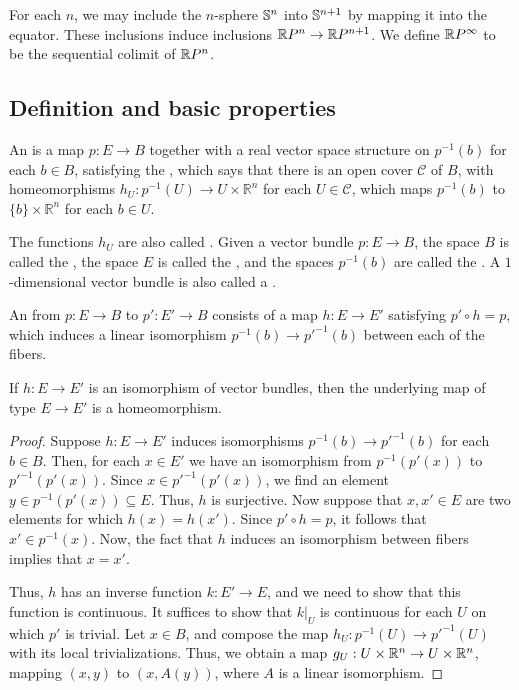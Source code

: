 \documentclass{article}
\begin{document}
\begin{defn}
For each $n$, we may include the $n$-sphere $\mathbb{S}^n$ into $\mathbb{S}^{n+1}$ by mapping
it into the equator. These inclusions induce inclusions $\mathbb{R} P^n\to \mathbb{R} P^{n+1}$.
We define $\mathbb{R} P^\infty$ to be the sequential colimit of $\mathbb{R} P^n$. 
\end{defn}

\subsection{Definition and basic properties}
\begin{defn}
An  is a map $p:E\to B$ together with a
real vector space structure on $p^{-1}(b)$ for each $b\in B$, satisfying the
, which says that there is an open cover 
$\mathcal{C}$ of $B$, with homeomorphisms $h_U:p^{-1}(U)\to U\times\mathbb{R}^n$
for each $U\in\mathcal{C}$, which maps $p^{-1}(b)$ to $\{b\}\times\mathbb{R}^n$
for each $b\in U$. 

The functions $h_U$ are also called . Given a
vector bundle $p:E\to B$, the space $B$ is called the , the
space $E$ is called the , and the spaces $p^{-1}(b)$ are
called the . A $1$-dimensional
vector bundle is also called a .
\end{defn}

\begin{defn}
An  from $p:E\to B$ to $p':E'\to B$
consists of a map $h:E\to E'$ satisfying $p'\circ h=p$, 
which induces a linear isomorphism
$p^{-1}(b)\to p'^{-1}(b)$ between each of the fibers.
\end{defn}

\begin{lem}
If $h:E\to E'$ is an isomorphism of vector bundles, then the underlying map
of type $E\to E'$ is a homeomorphism. 
\end{lem}

\begin{proof}
Suppose $h:E\to E'$ induces isomorphisms $p^{-1}(b)\to p'^{-1}(b)$ for each
$b\in B$. Then, for each $x\in E'$ we have an isomorphism from
$p^{-1}(p'(x))$ to $p'^{-1}(p'(x))$. Since $x\in p'^{-1}(p'(x))$, we find
an element $y\in p^{-1}(p'(x))\subseteq E$. Thus, $h$ is surjective. Now suppose
that $x,x'\in E$ are two elements for which $h(x)=h(x')$. Since $p'\circ h=p$,
it follows that $x'\in p^{-1}(x)$. Now, the fact that $h$ induces an isomorphism
between fibers implies that $x=x'$. 

Thus, $h$ has an inverse function $k:E'\to E$, and we need to show that this
function is continuous. It suffices to show that $k|_U$ is continuous for each
$U$ on which $p'$ is trivial. Let $x\in B$, and compose the map
$h_U:p^{-1}(U)\to p'^{-1}(U)$ with its local trivializations. Thus, we obtain
a map $g_U:U\times\mathbb{R}^n\to U\times \mathbb{R}^n$, mapping $(x,y)$ to $(x,A(y))$, where
$A$ is a linear isomorphism. 
\end{proof}
\end{document}
